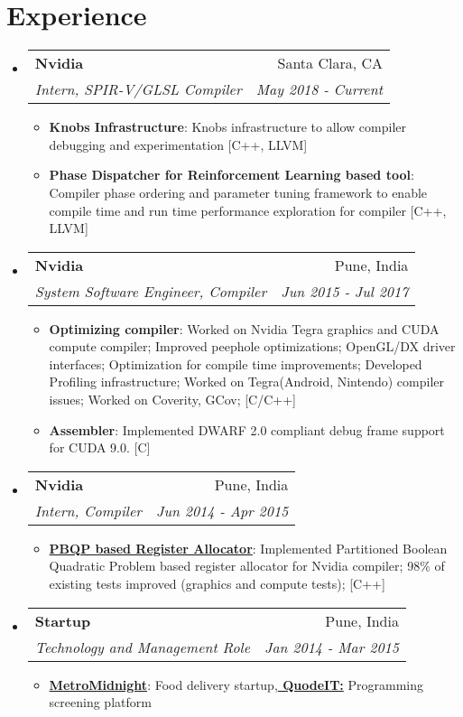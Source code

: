 \documentclass[letterpaper,11pt]{article}
\makeatletter
\newcommand{\resumeItem}[2]{
  \item\small{
    \textbf{#1}{: #2 \vspace{-2pt}}
  }
}
\newcommand{\resumeSubheading}[4]{
  \vspace{-1pt}\item
    \begin{tabular*}{0.97\textwidth}{l@{\extracolsep{\fill}}r}
      \textbf{#1} & #2 \\
      \textit{\small#3} & \textit{\small #4} \\
    \end{tabular*}\vspace{-5pt}
}
\newcommand{\resumeSubItem}[2]{\resumeItem{#1}{#2}\vspace{-4pt}}
\newcommand{\resumeSubHeadingListStart}{\begin{itemize}[leftmargin=*]}
\newcommand{\resumeSubHeadingListEnd}{\end{itemize}}
\newcommand{\resumeItemListStart}{\begin{itemize}}
\newcommand{\resumeItemListEnd}{\end{itemize}\vspace{-5pt}}
\makeatother
\begin{document}
\section{Experience}
  \resumeSubHeadingListStart
    \resumeSubheading
      {Nvidia}{Santa Clara, CA}
      {Intern, SPIR-V/GLSL Compiler}{May 2018 - Current}
      \resumeItemListStart
        \resumeSubItem{Knobs Infrastructure} {Knobs infrastructure to allow compiler debugging and experimentation [C++, LLVM]}
        \resumeSubItem{Phase Dispatcher for Reinforcement Learning based tool} {Compiler phase ordering and parameter tuning framework to enable compile time and run time performance exploration for compiler [C++, LLVM]}
      \resumeItemListEnd
    \resumeSubheading
      {Nvidia}{Pune, India}
      {System Software Engineer, Compiler}{Jun 2015 - Jul 2017}
      \resumeItemListStart
        \resumeSubItem{Optimizing compiler} {Worked on Nvidia Tegra graphics and CUDA compute compiler; Improved peephole optimizations; OpenGL/DX driver interfaces; Optimization for compile time improvements; Developed Profiling infrastructure; Worked on Tegra(Android, Nintendo) compiler issues; Worked on Coverity, GCov; [C/C++]}
        \resumeSubItem{Assembler}{Implemented DWARF 2.0 compliant debug frame support for CUDA 9.0. [C]}
      \resumeItemListEnd

    \resumeSubheading
      {Nvidia}{Pune, India}
      {Intern, Compiler}{Jun 2014 - Apr 2015}
      \resumeItemListStart
        \resumeSubItem{\href{http://slides.com/bhushansonawane/deck/}{PBQP based Register Allocator}}{Implemented Partitioned Boolean Quadratic Problem based register allocator for Nvidia compiler; 98\% of existing tests improved (graphics and compute tests); [C++]}
      \resumeItemListEnd
     \resumeSubheading
      {Startup}{Pune, India}
      {Technology and Management Role}{Jan 2014 - Mar 2015}
      \resumeItemListStart
      \resumeSubItem{\href{http://metromidnight.com/}{MetroMidnight}}{Food delivery startup,\textbf{\href{https://www.quodeit.com/}{ QuodeIT:}}{ Programming screening platform}}
      \resumeItemListEnd
   \resumeSubHeadingListEnd



\end{document}
